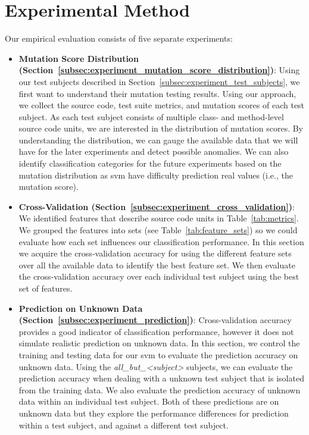 \section{Experimental Method}
\label{sec:experiment_method}
Our empirical evaluation consists of five separate experiments:

\begin{itemize}
  \item \textbf{Mutation Score Distribution (Section~\ref{subsec:experiment_mutation_score_distribution})}: Using our test subjects described in Section~\ref{subsec:experiment_test_subjects}, we first want to understand their mutation testing results. Using our approach, we collect the source code, test suite metrics, and mutation scores of each test subject. As each test subject consists of multiple class- and method-level source code units, we are interested in the distribution of mutation scores. By understanding the distribution, we can gauge the available data that we will have for the later experiments and detect possible anomalies. We can also identify classification categories for the future experiments based on the mutation distribution as \gls{svm} have difficulty prediction real values (i.e., the mutation score).
  \item \textbf{Cross-Validation (Section~\ref{subsec:experiment_cross_validation})}: We identified features that describe source code units in Table~\ref{tab:metrics}. We grouped the features into sets (see Table~\ref{tab:feature_sets}) so we could evaluate how each set influences our classification performance. In this section we acquire the cross-validation accuracy for using the different feature sets over all the available data to identify the best feature set. We then evaluate the cross-validation accuracy over each individual test subject using the best set of features.
  \item \textbf{Prediction on Unknown Data (Section~\ref{subsec:experiment_prediction})}: Cross-validation accuracy provides a good indicator of classification performance, however it does not simulate realistic prediction on unknown data. In this section, we  control the training and testing data for our \gls{svm} to evaluate the prediction accuracy on unknown data. Using the \emph{all\_but\_<subject>} subjects, we can evaluate the prediction accuracy when dealing with a unknown test subject that is isolated from the training data. We also evaluate the prediction accuracy of unknown data within an individual test subject. Both of these predictions are on unknown data but they explore the performance differences for prediction within a test subject, and against a different test subject.

\end{itemize}
